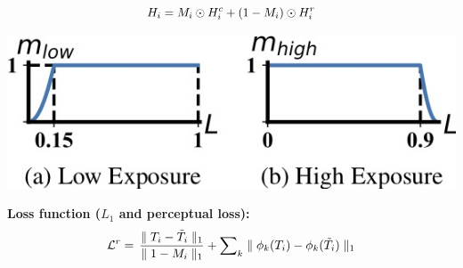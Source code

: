 \documentclass[landscape,a0paper,fontscale=0.292]{baposter}
\newcommand{\subheadercolor}{black}
\newcommand{\hdr}{H}
\newcommand{\tmhdr}{T}
\newcommand{\gttmhdr}{\tilde{\tmhdr}}
\newcommand{\coarsehdr}{\hdr^c}
\newcommand{\refinehdr}{\hdr^r}
\newcommand{\finalhdr}{\hdr}
\newcommand{\finaltmhdr}{\tmhdr}
\newcommand{\refineloss}{\mathcal{L}^r}
\newcommand{\validmask}{M}
\begin{document}
\begin{poster}
{\begin{minipage}[c]{0.48\linewidth}
        \begin{minipage}[c]{0.48\linewidth}
            \begin{equation}
                \label{eq:hdr_merge}
                \tiny
                \finalhdr_i = \validmask_i \odot \coarsehdr_i + (1 - \validmask_i) \odot \refinehdr_i
            \end{equation}
        \end{minipage}
        \hfill
        \begin{minipage}[c]{0.48\linewidth}
            \vspace{1em}
            \begin{center}
                \includegraphics[width=\textwidth]{images/blend_curve-crop.jpg}
            \end{center}
        \end{minipage}

        \vspace{1.0em} 
        \textbf{\color{\subheadercolor}Loss function ($L_1$ and perceptual loss):}
        \begin{equation}
            \tiny
            \refineloss = \, \frac{\parallel \finaltmhdr_i - \gttmhdr_i \parallel_1}{\parallel 1 - \validmask_i \parallel_1} + \sum\nolimits_k \parallel \phi_k(\tmhdr_i) - \phi_k(\gttmhdr_i) \parallel_1
        \end{equation}
    \end{minipage}


}
\end{poster}
\end{document}
